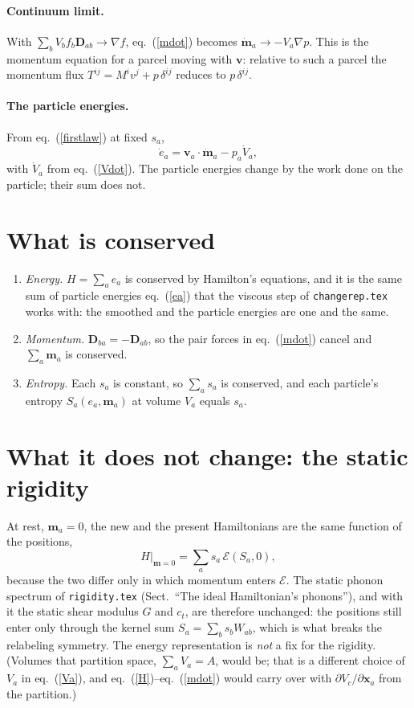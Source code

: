 \documentclass[11pt,aps,preprint,nofootinbib,superscriptaddress,tightenlines]{revtex4-2}
\def\st{\begin{equation}}
\def\stp{\end{equation}}
\def\Eq#1{eq.~(\ref{#1})}
\let\oldparagraph\paragraph
\renewcommand{\paragraph}{\par\bigskip\oldparagraph}
\begin{document}
\paragraph{Continuum limit.}  With $\sum_bV_bf_b\bm D_{ab}\to\nabla f$,
\Eq{mdot} becomes $\dot{\bm m}_a\to-V_a\nabla p$.  This is the momentum equation
for a parcel moving with $\bm v$: relative to such a parcel the momentum flux
$T^{ij}=M^iv^j+p\,\delta^{ij}$ reduces to $p\,\delta^{ij}$.

\paragraph{The particle energies.}  From \Eq{firstlaw} at fixed $s_a$,
\st
\dot e_a=\bm v_a\cdot\dot{\bm m}_a-p_a\dot V_a ,
\label{edot}
\stp
with $\dot V_a$ from \Eq{Vdot}.  The particle energies change by the work done on
the particle; their sum does not.

\section{What is conserved}
\label{sec:cons}

\begin{enumerate}
\item \emph{Energy.}  $H=\sum_ae_a$ is conserved by Hamilton's equations, and it is
  the same sum of particle energies \Eq{ea} that the viscous step of
  \texttt{changerep.tex} works with: the smoothed and the particle energies are
  one and the same.
\item \emph{Momentum.}  $\bm D_{ba}=-\bm D_{ab}$, so the pair forces in
  \Eq{mdot} cancel and $\sum_a\bm m_a$ is conserved.
\item \emph{Entropy.}  Each $s_a$ is constant, so $\sum_as_a$ is conserved, and
  each particle's entropy $S_a(e_a,\bm m_a)$ at volume $V_a$ equals $s_a$.
\end{enumerate}

\section{What it does not change: the static rigidity}
\label{sec:rigidity}

At rest, $\bm m_a=0$, the new and the present Hamiltonians are the same function of
the positions,
\st
H\big|_{\bm m=0}=\sum_as_a\,\mathcal E(S_a,0),
\stp
because the two differ only in which momentum enters $\mathcal E$.  The static phonon
spectrum of \texttt{rigidity.tex} (Sect.~``The ideal Hamiltonian's phonons''),
and with it the static shear modulus $G$ and $c_t$, are therefore unchanged: the
positions still enter only through the kernel sum $S_a=\sum_bs_bW_{ab}$, which is
what breaks the relabeling symmetry.  The energy representation is \emph{not} a
fix for the rigidity.  (Volumes that partition space, $\sum_aV_a=A$, would be; that
is a different choice of $V_a$ in \Eq{Va}, and \Eq{H}--\Eq{mdot} would carry over
with $\partial V_c/\partial\bm x_a$ from the partition.)
\end{document}
